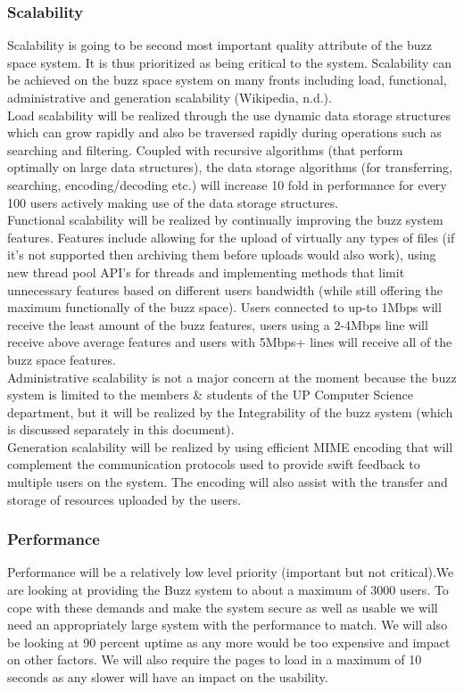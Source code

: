 \subsubsection{Scalability}
Scalability is going to be second most important quality attribute of the buzz space system. It is thus prioritized as being critical to the system. Scalability can be achieved on the buzz space system on many fronts including load, functional, administrative and generation scalability (Wikipedia, n.d.).\\

Load scalability will be realized through the use dynamic data storage structures which can grow rapidly and also be traversed rapidly during operations such as searching and filtering. Coupled with recursive algorithms (that perform optimally on large data structures), the data storage algorithms (for transferring, searching, encoding/decoding etc.) will increase 10 fold in performance for every 100 users actively making use of the data storage structures.\\

Functional scalability will be realized by continually improving the buzz system features. Features include allowing for the upload of virtually any types of files (if it’s not supported then archiving them before uploads would also work), using new thread pool API’s for threads and implementing methods that limit unnecessary features based on different users bandwidth (while still offering the maximum functionally of the buzz space). Users connected to up-to 1Mbps will receive the least amount of the buzz features, users using a 2-4Mbps line will receive above average features and users with 5Mbps+ lines will receive all of the buzz space features.\\

Administrative scalability is not a major concern at the moment because the buzz system is limited to the members \& students of the UP Computer Science department, but it will be realized by the Integrability of the buzz system (which is discussed separately in this document).\\

Generation scalability will be realized by using efficient MIME encoding that will complement the communication protocols used to provide swift feedback to multiple users on the system. The encoding will also assist with the transfer and storage of resources uploaded by the users.     
\subsubsection{Performance}
Performance will be a relatively low level priority (important but not critical).We are looking at providing the Buzz system to about a maximum of 3000 users. To cope with these demands and make the system secure as well as usable we will need an appropriately large system with the performance to match. We will also be looking at 90 percent uptime as any more would be too expensive and impact on other factors. We will also require the pages to load in a maximum of 10 seconds as any slower will have an impact on the usability.
